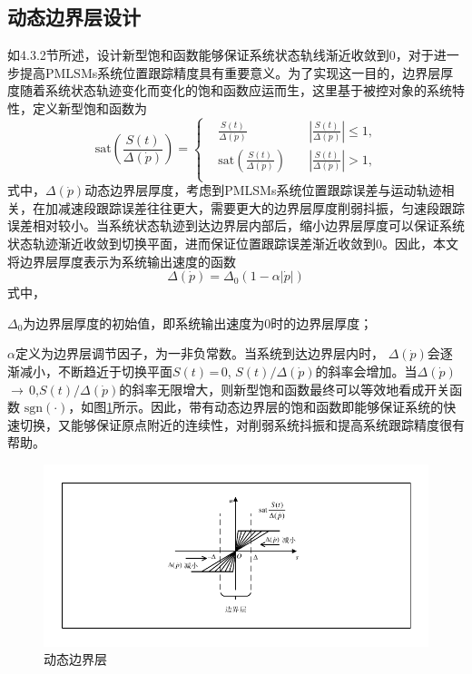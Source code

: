 \subsection{动态边界层设计}
如4.3.2节所述，设计新型饱和函数能够保证系统状态轨线渐近收敛到0，对于进一步提高PMLSMs系统位置跟踪精度具有重要意义。为了实现这一目的，边界层厚度随着系统状态轨迹变化而变化的饱和函数应运而生\cite{jin2007investigation}，这里基于被控对象的系统特性，定义新型饱和函数为
\begin{equation}
\text{sat}\left(\frac{S(t)}{\Delta(\dot{p})}\right)=\left\{\begin{aligned}
&\frac{S(t)}{\Delta(\dot{p})} \quad&\left|\frac{S(t)}{\Delta(\dot{p})}\right|\le1\text{,} \\ 
&\text{sat}\left(\frac{S(t)}{\Delta(\dot{p})}\right) \quad&\left|\frac{S(t)}{\Delta(\dot{p})} \right|>1\text{,} \\ 
\end{aligned}\right.
\end{equation}
式中，$\Delta(\dot{p})$动态边界层厚度，考虑到PMLSMs系统位置跟踪误差与运动轨迹相关，在加减速段跟踪误差往往更大，需要更大的边界层厚度削弱抖振，匀速段跟踪误差相对较小。当系统状态轨迹到达边界层内部后，缩小边界层厚度可以保证系统状态轨迹渐近收敛到切换平面，进而保证位置跟踪误差渐近收敛到0。因此，本文将边界层厚度表示为系统输出速度的函数 
\begin{equation}
\Delta(\dot{p})={{\Delta}_{0}}(1-\alpha\left|{\dot{p}}\right|)
\end{equation}
式中，

$\Delta_0$为边界层厚度的初始值，即系统输出速度为0时的边界层厚度；

$\alpha$定义为边界层调节因子，为一非负常数。当系统到达边界层内时， $\Delta(\dot{p})$会逐渐减小，不断趋近于切换平面$S(t)$\,=\,0, $S(t)/\Delta(\dot{p})$的斜率会增加。当$\Delta(\dot{p})$\,$\to$\,0,$S(t)/\Delta(\dot{p})$的斜率无限增大，则新型饱和函数最终可以等效地看成开关函数 $\text{sgn}(\cdot)$，如图\ref{动态边界层}所示。因此，带有动态边界层的饱和函数即能够保证系统的快速切换，又能够保证原点附近的连续性，对削弱系统抖振和提高系统跟踪精度很有帮助。 
\begin{figure}[H]
	\centering
	\includegraphics[width=12cm]{figures/动态边界层1.pdf}
	\caption{动态边界层}
	\label{动态边界层}
\end{figure}

